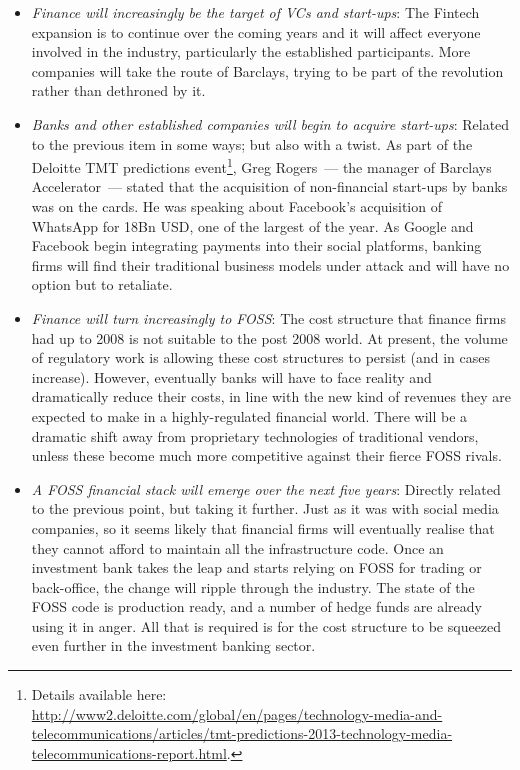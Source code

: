 \documentclass{book}
\begin{document}
\begin{itemize}
\item \emph{Finance will increasingly be the target of VCs and
  start-ups}: The Fintech expansion is to continue over the coming
  years and it will affect everyone involved in the industry,
  particularly the established participants. More companies will take
  the route of Barclays, trying to be part of the revolution rather
  than dethroned by it.
\item \emph{Banks and other established companies will begin to
  acquire start-ups}: Related to the previous item in some ways; but
  also with a twist. As part of the Deloitte TMT predictions
  event\footnote{Details available here: \sloppy
    \url{http://www2.deloitte.com/global/en/pages/technology-media-and-telecommunications/articles/tmt-predictions-2013-technology-media-telecommunications-report.html}.},
  Greg Rogers~--- the manager of Barclays Accelerator~--- stated that
  the acquisition of non-financial start-ups by banks was on the
  cards. He was speaking about Facebook's acquisition of WhatsApp for
  18Bn USD, one of the largest of the year. As Google and Facebook
  begin integrating payments into their social platforms, banking
  firms will find their traditional business models under attack and
  will have no option but to retaliate.
\item \emph{Finance will turn increasingly to FOSS}: The cost
  structure that finance firms had up to 2008 is not suitable to the
  post 2008 world. At present, the volume of regulatory work is
  allowing these cost structures to persist (and in cases
  increase). However, eventually banks will have to face reality and
  dramatically reduce their costs, in line with the new kind of
  revenues they are expected to make in a highly-regulated financial
  world. There will be a dramatic shift away from proprietary
  technologies of traditional vendors, unless these become much more
  competitive against their fierce FOSS rivals.
\item \emph{A FOSS financial stack will emerge over the next five
  years}: Directly related to the previous point, but taking it
  further. Just as it was with social media companies, so it seems
  likely that financial firms will eventually realise that they cannot
  afford to maintain all the infrastructure code. Once an investment
  bank takes the leap and starts relying on FOSS for trading or
  back-office, the change will ripple through the industry. The state
  of the FOSS code is production ready, and a number of hedge funds
  are already using it in anger. All that is required is for the cost
  structure to be squeezed even further in the investment banking
  sector.
\end{itemize}
\end{document}
